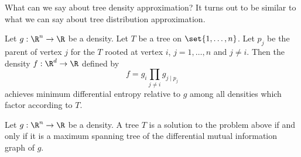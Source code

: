
What can we say about tree density approximation? It turns out to be similar to what we can say about tree distribution approximation.


\begin{prop}
  Let $g: \R^n \to \R$ be a density.
  Let $T$ be
  a tree on $\set{1, \dots, n}$.
  Let $p_j$ be
  the parent of vertex $j$ for the $T$ rooted
  at vertex $i$, $j = 1,\dots,n$ and $j \neq i$.
  Then the density $f: \R^d \to \R$ defined by
  \[
    f = g_i \prod_{j \neq i} g_{j \mid p_j}
  \]
  achieves minimum differential entropy relative to $g$ among
  all densities which factor according to $T$.
\end{prop}

\begin{prop}
  Let $g: \R^n \to \R$ be a density.
  A tree $T$ is a solution to the problem above
  if and only if it is a maximum spanning
  tree of the differential mutual information graph of $g$.
\end{prop}


\strats
